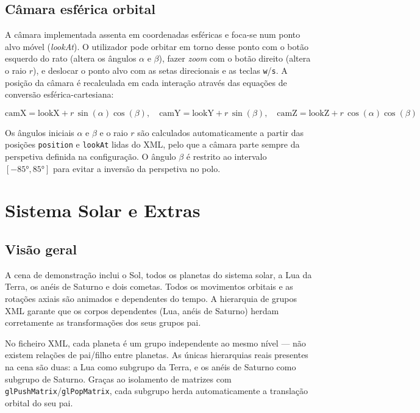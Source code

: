 \documentclass[12pt,a4paper]{article}
\begin{document}
\subsection{Câmara esférica orbital}

A câmara implementada assenta em coordenadas esféricas e foca-se num ponto alvo móvel (\textit{lookAt}). O utilizador pode orbitar em torno desse ponto com o botão esquerdo do rato (altera os ângulos $\alpha$ e $\beta$), fazer \textit{zoom} com o botão direito (altera o raio $r$), e deslocar o ponto alvo com as setas direcionais e as teclas \texttt{w}/\texttt{s}. A posição da câmara é recalculada em cada interação através das equações de conversão esférica-cartesiana:

\begin{equation}
    \text{camX} = \text{lookX} + r\,\sin(\alpha)\cos(\beta), \quad
    \text{camY} = \text{lookY} + r\,\sin(\beta), \quad
    \text{camZ} = \text{lookZ} + r\,\cos(\alpha)\cos(\beta)
\end{equation}

Os ângulos iniciais $\alpha$ e $\beta$ e o raio $r$ são calculados automaticamente a partir das posições \texttt{position} e \texttt{lookAt} lidas do XML, pelo que a câmara parte sempre da perspetiva definida na configuração. O ângulo $\beta$ é restrito ao intervalo $[-85°, 85°]$ para evitar a inversão da perspetiva no polo.

\section{Sistema Solar e Extras}

\subsection{Visão geral}

A cena de demonstração inclui o Sol, todos os planetas do sistema solar, a Lua da Terra, os anéis de Saturno e dois cometas. Todos os movimentos orbitais e as rotações axiais são animados e dependentes do tempo. A hierarquia de grupos XML garante que os corpos dependentes (Lua, anéis de Saturno) herdam corretamente as transformações dos seus grupos pai.

No ficheiro XML, cada planeta é um grupo independente ao mesmo nível — não existem relações de pai/filho entre planetas. As únicas hierarquias reais presentes na cena são duas: a Lua como subgrupo da Terra, e os anéis de Saturno como subgrupo de Saturno. Graças ao isolamento de matrizes com \texttt{glPushMatrix}/\texttt{glPopMatrix}, cada subgrupo herda automaticamente a translação orbital do seu pai.
\end{document}
